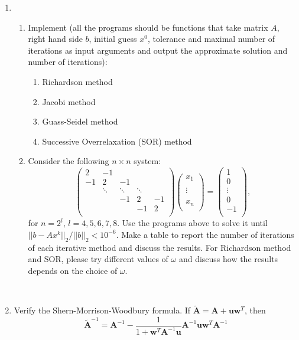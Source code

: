\documentclass[12pt]{amsart}
\numberwithin{equation}{section}
\numberwithin{table}{section}
\numberwithin{figure}{section}
\numberwithin{algorithm}{section}
\begin{document}
\begin{enumerate}
\item \begin{enumerate}
	\item Implement (all the programs should be functions that take matrix $A$, right hand side $b$, initial guess $x^0$, tolerance and maximal number of iterations as input arguments and output the approximate solution and number of iterations): 
		\begin{enumerate}
		\item Richardson method
		\item Jacobi method
		\item Guass-Seidel method
		\item Successive Overrelaxation (SOR) method
		\end{enumerate}
 	\item Consider the following $n \times n$ system:
		$$\left(%
	\begin{array}{ccccc}
	  2 & -1 &  &  &  \\
	  -1 & 2 & -1 &  &  \\
	   & \ddots & \ddots & \ddots &  \\
	   &  & -1 & 2 & -1 \\
	   &  &  & -1 & 2 \\
	\end{array}%
	\right)
	\left(%
	\begin{array}{c}	
	  x_1 \\
	   \\
	   \vdots\\
	   \\
	  x_n \\
	\end{array}%
	\right)=
	\left(%
	\begin{array}{r}
	  1 \\
	  0 \\
	  \vdots \\
	  0 \\
	  -1 \\
	\end{array}%
	\right), 
	$$	
	for  $n=2^l$, $l=4,5,6,7,8$. Use the programs above to solve it until $|| b - A x^k ||_2/ ||b||_2 < 10^{-6}$. Make a table to report the number of iterations of each iterative method and discuss the results.  For Richardson method and SOR, please try different values of $\omega$ and discuss how the results depends on the choice of $\omega$.
	\end{enumerate}
	
\

\item Verify the Shern-Morrison-Woodbury formula. If $\widetilde{\mathbf{A}} = \mathbf{A} + \mathbf{uw}^{T}$, then
$$
\widetilde{\mathbf{A}}^{-1} = \mathbf{A}^{-1} - \frac{1}{1+\mathbf{w}^{T} \mathbf{A}^{-1} \mathbf{u}} \mathbf{A}^{-1} \mathbf{u w}^{T} \mathbf{A}^{-1}
$$



\end{enumerate}
\end{document}
